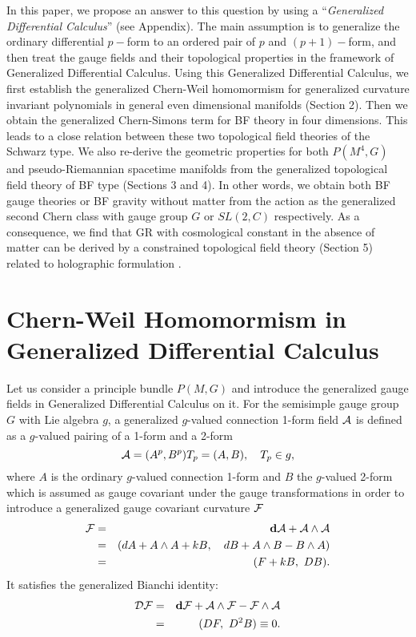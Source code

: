 \documentclass[a4paper,twocolumn,showpacs,prd]{revtex4}
\begin{document}
In this paper, we propose an answer to this question by using a
``{\it Generalized Differential Calculus}'' (see
Appendix)\cite{Sparling,NR2001}. The main assumption is to
generalize the ordinary differential $p-$form to an ordered pair
of $p$ and $(p+1)-$form, and then treat the gauge fields and their
topological properties in the framework of Generalized
Differential Calculus. Using this Generalized Differential
Calculus, we first establish the generalized Chern-Weil
homomormism for generalized curvature invariant polynomials in
general even dimensional manifolds (Section 2). Then we obtain the
generalized Chern-Simons term for BF theory in four dimensions.
This leads to a close relation between these two topological field
theories of the Schwarz type. We also re-derive the geometric
properties for both $P(M^4, G)$ and pseudo-Riemannian spacetime
manifolds from the generalized topological field theory of BF type
(Sections 3 and 4). In other words, we obtain both BF gauge
theories or BF gravity without matter from the action as the
generalized second Chern class with gauge group $G$ or $SL(2,C)$
respectively. As a consequence, we find that GR with cosmological
constant in the absence of matter can be derived by a constrained
topological field theory (Section 5) related to holographic
formulation \cite{Smolin}.

\section{Chern-Weil Homomormism in Generalized Differential Calculus}

Let us consider a principle bundle $P(M, G)$ and introduce the
generalized gauge fields in Generalized Differential Calculus on
it. For the semisimple gauge group $G$ with Lie algebra ${ g}$, a
generalized $g$-valued connection 1-form field ${\cal A}$  is
defined as a $g$-valued pairing of a 1-form and a 2-form
\begin{equation}
{\cal A}=( A^{p}, B^{p} ) T_{p} =(A, B),\quad T_p
\in g, \label{1}
\end{equation}
where ${A} $ is the ordinary $g$-valued
connection 1-form and $B$  the $g$-valued 2-form
which is assumed as gauge covariant under the
gauge transformations in order to introduce a
generalized gauge covariant curvature ${\cal F}$
\begin{eqnarray}
 {\cal F} &=&{\bf d}{\cal A} + {\cal A} \wedge {\cal A}\nonumber\\
 &=& \left( dA+A\wedge
 A+k B, \quad  d B+
 A\wedge B -B \wedge A \right) \nonumber\\
 &=&(F+ k B,~ D B).
\end{eqnarray}
It satisfies the generalized Bianchi identity:
\begin{eqnarray}\label{GBI}
 {\cal D} {\cal F} &=& {\bf d} {\cal F}
 + {\cal A}\wedge
 {\cal F} - {\cal F} \wedge {\cal A}
 \nonumber \\
 &=&( DF, ~D^2 B) \equiv 0 .
\end{eqnarray}
\end{document}
